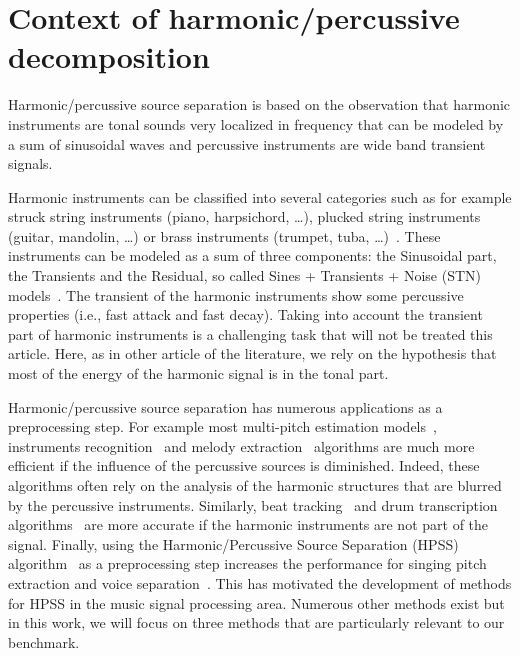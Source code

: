 \section{Context of harmonic/percussive decomposition}
\label{sec:Background}

Harmonic/percussive source separation is based on the observation that harmonic instruments are tonal sounds very localized in frequency that can be modeled by a sum of sinusoidal waves and percussive instruments are wide band transient signals.

Harmonic instruments can be classified into several categories such as for example struck string instruments (piano, harpsichord, \ldots), plucked string instruments (guitar, mandolin, \ldots) or brass instruments (trumpet, tuba, \ldots)~\cite{peeters2003automatic}. These instruments can be modeled as a sum of three components: the Sinusoidal part, the Transients and the Residual, so called  Sines + Transients + Noise (STN) models~\cite{daudet2006review}. The transient of the harmonic instruments show some percussive properties (i.e., fast attack and fast decay). Taking into account the transient part of harmonic instruments is a challenging task that will not be treated this article. Here, as in other article of the literature, we rely on the hypothesis that most of the energy of the harmonic signal is in the tonal part. 

Harmonic/percussive source separation has numerous applications as a preprocessing step. For example most multi-pitch estimation models~\cite{klapuri2008multipitch}, instruments recognition~\cite{eronen2000musical} and melody extraction~\cite{salamon2012melody} algorithms are much more efficient if the influence of the percussive sources is diminished. Indeed, these algorithms often rely on the analysis of the harmonic structures that are blurred by the percussive instruments. Similarly, beat tracking~\cite{ellis2007beat} and drum transcription algorithms~\cite{paulus2005drum} are more accurate if the harmonic instruments are not part of the signal. Finally, using the Harmonic/Percussive Source Separation (HPSS) algorithm~\cite{fitzgerald2010harmonic} as a preprocessing step increases the performance for singing pitch extraction and voice separation~\cite{hsu2012tandem}. This has motivated the development of methods for HPSS in the music signal processing area. Numerous other methods exist but in this work, we will focus on three methods that are particularly relevant to our benchmark. 

